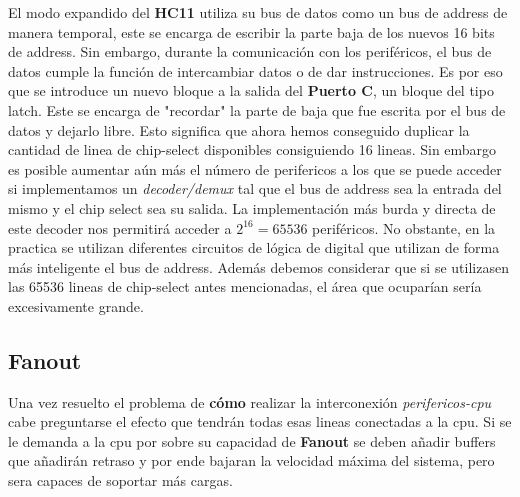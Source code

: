  El modo expandido del \textbf{HC11} utiliza su bus de datos como un bus de address de manera temporal, este se encarga de escribir la parte baja de los nuevos 16 bits de address. Sin embargo, durante la comunicación con los periféricos, el bus de datos cumple la función de intercambiar datos o de dar instrucciones. Es por eso que se introduce un nuevo bloque a la salida del \textbf{Puerto C}, un bloque del tipo latch. Este se encarga de "recordar" la parte de baja que fue escrita por el bus de datos y dejarlo libre.
 Esto significa que ahora hemos conseguido duplicar la cantidad de linea de chip-select disponibles consiguiendo 16 lineas. 
 Sin embargo es posible aumentar aún más el número de perifericos a los que se puede acceder si implementamos un \textit{decoder/demux} tal que el bus de address sea la entrada del mismo y el chip select sea su salida. La implementación más burda y directa de este decoder nos permitirá acceder a $2^16 = 65536$ periféricos. No obstante, en la practica se utilizan diferentes circuitos de lógica de digital que utilizan de forma más inteligente el bus de address. Además debemos considerar que si se utilizasen las 65536 lineas de chip-select antes mencionadas, el área que ocuparían sería excesivamente grande.
 
 \subsection{Fanout}
 Una vez resuelto el problema de \textbf{cómo} realizar la interconexión \textit{perifericos-cpu} cabe preguntarse el efecto que tendrán todas esas lineas conectadas a la cpu. Si se le demanda a la cpu por sobre su capacidad de \textbf{Fanout} se deben añadir buffers que añadirán retraso y por ende bajaran la velocidad máxima del sistema, pero sera capaces de soportar más cargas.
 
 
